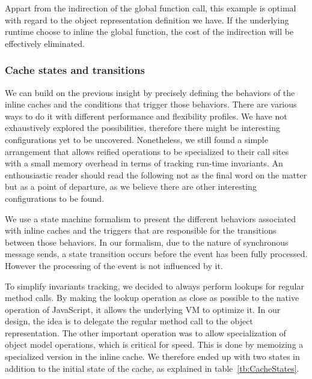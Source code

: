 
Appart from the indirection of the global function call, this example is
optimal with regard to the object representation definition we have. If the
underlying runtime choose to inline the global function, the cost of the
indirection will be effectively eliminated.

\subsubsection{Cache states and transitions}

We can build on the previous insight by precisely defining the behaviors of the
inline caches and the conditions that trigger those behaviors. There are
various ways to do it with different performance and flexibility profiles. We
have not exhaustively explored the possibilities, therefore there might be
interesting configurations yet to be uncovered. Nonetheless, we still found a
simple arrangement that allows reified operations to be specialized to their
call sites with a small memory overhead in terms of tracking run-time
invariants.  An enthousiastic reader should read the following not as the final
word on the matter but as a point of departure, as we believe there are other
interesting configurations to be found.

We use a state machine formalism to present the different behaviors associated
with inline caches and the triggers that are responsible for the transitions
between those behaviors. In our formalism, due to the nature of synchronous
message sends, a state transition occurs before the event has been fully
processed. However the processing of the event is not influenced by it.  

To simplify invariants tracking, we decided to always perform lookups for
regular method calls. By making the lookup operation as close as possible to
the native operation of JavaScript, it allows the underlying VM to optimize it.
In our design, the idea is to delegate the regular method call to the object
representation. The other important operation was to allow specialization of
object model operations, which is critical for speed. This is done by memoizing
a specialized version in the inline cache. We therefore ended up with two
states in addition to the initial state of the cache, as explained in
table~\ref{tb:CacheStates}.

